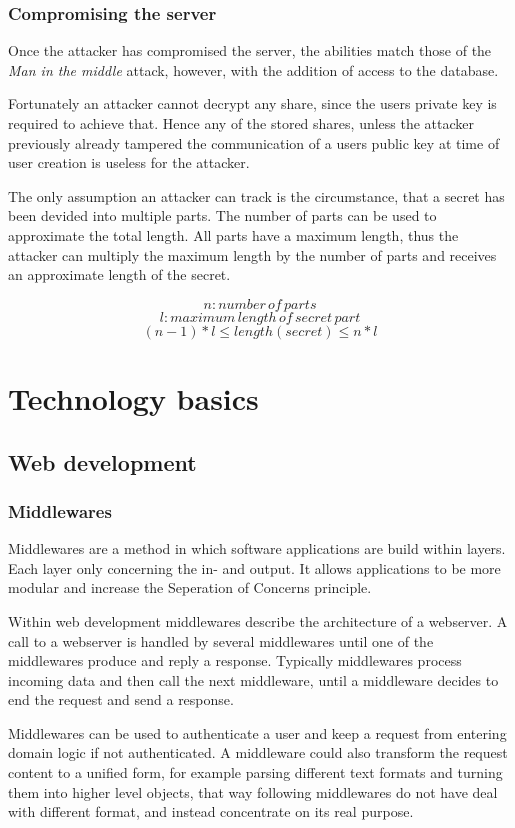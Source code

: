 \subsection{Compromising the server}

Once the attacker has compromised the server, the abilities match those of the
\textit{Man in the middle} attack, however, with the addition of access to the
database.

Fortunately an attacker cannot decrypt any share, since the users private key
is required to achieve that. Hence any of the stored shares, unless the
attacker previously already tampered the communication of a users public key at
time of user creation is useless for the attacker.

The only assumption an attacker can track is the circumstance, that a secret
has been devided into multiple parts. The number of parts can be used to
approximate the total length. All parts have a maximum length, thus the
attacker can multiply the maximum length by the number of parts and receives an
approximate length of the secret.

$$n: number\,of\,parts$$
$$l: maximum\,length\,of\,secret\,part$$
$$(n - 1) * l \leq length(secret) \leq n * l$$

\chapter{Technology basics}
\section{Web development}
\subsection{Middlewares}

Middlewares are a method in which software applications are build within
layers. Each layer only concerning the in- and output. It allows applications
to be more modular and increase the Seperation of Concerns principle.

Within web development middlewares describe the architecture of a webserver.  A
call to a webserver is handled by several middlewares until one of the
middlewares produce and reply a response. Typically middlewares process
incoming data and then call the next middleware, until a middleware decides to
end the request and send a response.

Middlewares can be used to authenticate a user and keep a request from entering
domain logic if not authenticated. A middleware could also transform the
request content to a unified form, for example parsing different text formats
and turning them into higher level objects, that way following middlewares do
not have deal with different format, and instead concentrate on its real
purpose.

